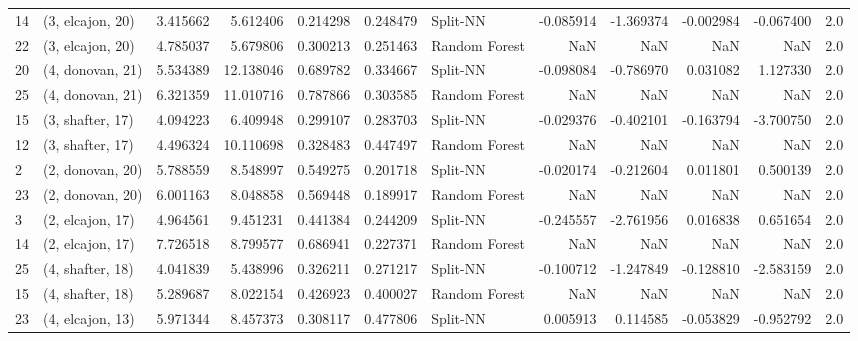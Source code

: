 \begin{tabular}{llrrrrlrrrrr}
14 &  (3, elcajon, 20) &  3.415662 &   5.612406 &   0.214298 &  0.248479 &       Split-NN &       -0.085914 &     -1.369374 &      -0.002984 &    -0.067400 &            2.0 \\
22 &  (3, elcajon, 20) &  4.785037 &   5.679806 &   0.300213 &  0.251463 &  Random Forest &             NaN &           NaN &            NaN &          NaN &            2.0 \\
20 &  (4, donovan, 21) &  5.534389 &  12.138046 &   0.689782 &  0.334667 &       Split-NN &       -0.098084 &     -0.786970 &       0.031082 &     1.127330 &            2.0 \\
25 &  (4, donovan, 21) &  6.321359 &  11.010716 &   0.787866 &  0.303585 &  Random Forest &             NaN &           NaN &            NaN &          NaN &            2.0 \\
15 &  (3, shafter, 17) &  4.094223 &   6.409948 &   0.299107 &  0.283703 &       Split-NN &       -0.029376 &     -0.402101 &      -0.163794 &    -3.700750 &            2.0 \\
12 &  (3, shafter, 17) &  4.496324 &  10.110698 &   0.328483 &  0.447497 &  Random Forest &             NaN &           NaN &            NaN &          NaN &            2.0 \\
2  &  (2, donovan, 20) &  5.788559 &   8.548997 &   0.549275 &  0.201718 &       Split-NN &       -0.020174 &     -0.212604 &       0.011801 &     0.500139 &            2.0 \\
23 &  (2, donovan, 20) &  6.001163 &   8.048858 &   0.569448 &  0.189917 &  Random Forest &             NaN &           NaN &            NaN &          NaN &            2.0 \\
3  &  (2, elcajon, 17) &  4.964561 &   9.451231 &   0.441384 &  0.244209 &       Split-NN &       -0.245557 &     -2.761956 &       0.016838 &     0.651654 &            2.0 \\
14 &  (2, elcajon, 17) &  7.726518 &   8.799577 &   0.686941 &  0.227371 &  Random Forest &             NaN &           NaN &            NaN &          NaN &            2.0 \\
25 &  (4, shafter, 18) &  4.041839 &   5.438996 &   0.326211 &  0.271217 &       Split-NN &       -0.100712 &     -1.247849 &      -0.128810 &    -2.583159 &            2.0 \\
15 &  (4, shafter, 18) &  5.289687 &   8.022154 &   0.426923 &  0.400027 &  Random Forest &             NaN &           NaN &            NaN &          NaN &            2.0 \\
23 &  (4, elcajon, 13) &  5.971344 &   8.457373 &   0.308117 &  0.477806 &       Split-NN &        0.005913 &      0.114585 &      -0.053829 &    -0.952792 &            2.0 \\

\end{tabular}
